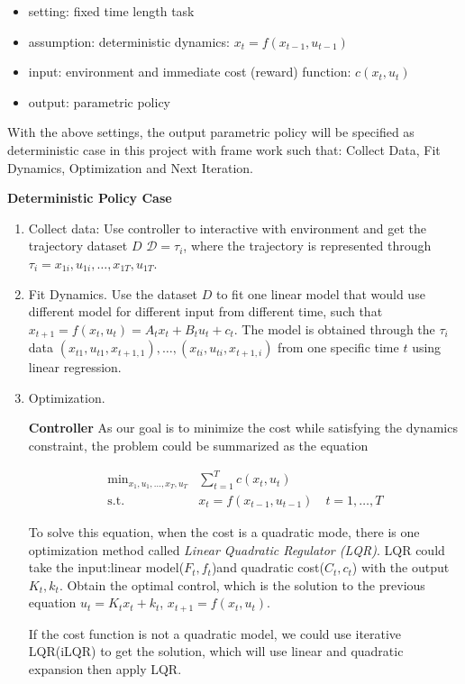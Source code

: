 \documentclass[catalog.tex]{subfiles}
\begin{document}
\begin{itemize}
\item setting: fixed time length task
\item assumption: deterministic dynamics: $x_t=f(x_{t-1},u_{t-1})$
\item input: environment and immediate cost (reward) function: $c(x_t, u_t)$
\item output: parametric policy
\end{itemize}

With the above settings, the output parametric policy will be specified as deterministic case in this project with frame work such that: Collect Data, Fit Dynamics, Optimization and Next Iteration. 


\textbf{Deterministic Policy Case}
\begin{enumerate}
\item Collect data: Use controller to interactive with environment and get the trajectory dataset $D$
$\mathcal{D} = { \tau_i }$, where the trajectory is represented through $\tau_i = { x_{1i}, u_{1i}, \dots , x_{1T}, u_{1T} }$.
\item Fit Dynamics. Use the dataset $D$ to fit one linear model that would use different model for different input from different time, such that $x_{t+1} = f(x_t, u_t) = A_tx_t + B_tu_t + c_t$. The model is obtained through the $\tau_i$ data ${ (x_{t1}, u_{t1}, x_{t+1,1}), \dots , (x_{ti}, u_{ti}, x_{t+1,i}) }$ from one specific time  $t$ using linear regression. 
\item  Optimization. 

\textbf{Controller}
As our goal is to minimize the cost while satisfying the dynamics constraint, the problem could be summarized as the equation 

\begin{align*}
\mathop{\text{min }}_{x_1, u_1, ..., x_T, u_T} & \sum_{t=1}^T c(x_t, u_t) \\
\text{s.t. } & x_t = f(x_{t-1}, u_{t-1}) \quad t=1, \dots, T
\end{align*}

To solve this equation, when the cost is a quadratic mode, there is one optimization method called \textit{Linear Quadratic Regulator (LQR)}. LQR could take the input:linear model($F_t, f_t$)and quadratic cost($C_t, c_t$) with the output $K_t, k_t$. Obtain the optimal control, which is the solution to the previous equation $u_t=K_tx_t+k_t$, $x_{t+1}=f(x_t, u_t)$.

If the cost function is not a quadratic model, we could use iterative LQR(iLQR) to get the solution, which will use linear and quadratic expansion then apply LQR. 



\end{enumerate}
\end{document}
